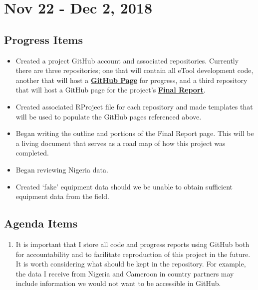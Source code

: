 \documentclass[]{article}
\providecommand{\tightlist}{%
  \setlength{\itemsep}{0pt}\setlength{\parskip}{0pt}}
\begin{document}
\hypertarget{nov-22---dec-2-2018}{%
\section{Nov 22 - Dec 2, 2018}\label{nov-22---dec-2-2018}}

\hypertarget{progress-items-14}{%
\subsection{Progress Items}\label{progress-items-14}}

\begin{itemize}
\tightlist
\item
  Created a project GitHub account and associated repositories.
  Currently there are three repositories; one that will contain all
  eTool development code, another that will host a
  \textbf{\href{https://pages.github.com/}{GitHub Page}} for progress,
  and a third repository that will host a GitHub page for the project's
  \textbf{\href{https://paceafenet.github.io/final_report/}{Final
  Report}}.
\item
  Created associated RProject file for each repository and made
  templates that will be used to populate the GitHub pages referenced
  above.
\item
  Began writing the outline and portions of the Final Report page. This
  will be a living document that serves as a road map of how this
  project was completed.
\item
  Began reviewing Nigeria data.
\item
  Created `fake' equipment data should we be unable to obtain sufficient
  equipment data from the field.
\end{itemize}

\hypertarget{agenda-items-14}{%
\subsection{Agenda Items}\label{agenda-items-14}}

\begin{enumerate}
\def\labelenumi{\arabic{enumi}.}
\tightlist
\item
  It is important that I store all code and progress reports using
  GitHub both for accountability and to facilitate reproduction of this
  project in the future. It is worth considering what should be kept in
  the repository. For example, the data I receive from Nigeria and
  Cameroon in country partners may include information we would not want
  to be accessible in GitHub.
\end{enumerate}
\end{document}
